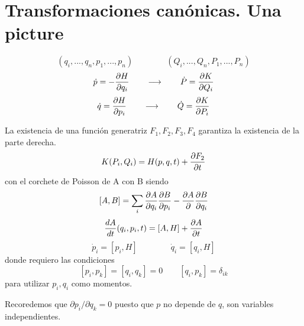 \documentclass[10pt,oneside]{CBFT_book}
\begin{document}
\section{Transformaciones canónicas. Una picture}

\[
	(q_i,...,q_n,p_1,...,p_n) \qquad \qquad (Q_i,...,Q_n,P_1,...,P_n)
\]
\[
	\dot{p} = -\dpar{H}{q_i} \qquad \longrightarrow \qquad \dot{P} = \dpar{K}{Q_i}
\]
\[
	\dot{q} = \dpar{H}{p_i} \qquad \longrightarrow \qquad \dot{Q} = \dpar{K}{P_i}
\]

La existencia de una función generatriz $F_1,F_2,F_3,F_4$ garantiza la existencia de la parte derecha.
\[
	K(P_i,Q_i) = H(p,q,t) + \dpar{F_2}{t}
\]
con el corchete de Poisson de A con B siendo 
\[
	[A,B] = \sum_i \dpar{A}{q_i} \dpar{B}{p_i} - \dpar{A}{} \dpar{B}{q_i}
\]
\[
	\dtot{A}{t}(q_i,p_i,t) = [A,H] + \dpar{A}{t}
\]
\[
	\dot{p}_i = [p_i, H] \qquad \qquad \dot{q}_i = [q_i, H]
\]
donde requiero las condiciones
\[
	[p_i, p_k] = [q_i, q_k] = 0 \qquad [q_i, p_k]= \delta_{ik}
\]
para utilizar $p_i,q_i$ como momentos.

Recoredemos que $\partial p_i / \partial q_k = 0$ puesto que $p$ no depende de $q$, son variables independientes.

\end{document}
